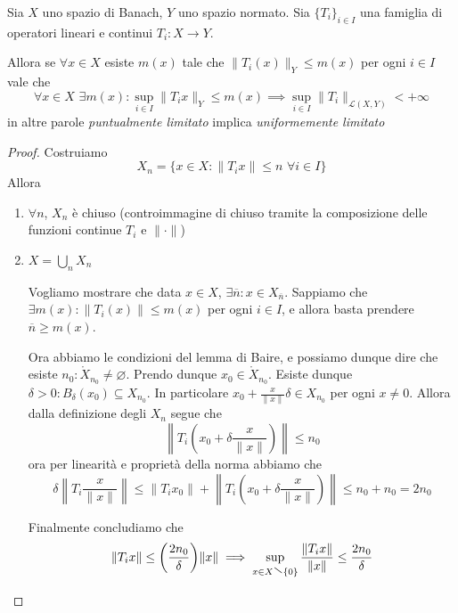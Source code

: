 \begin{theorem}\label{thm:banach-steinhaus}
    Sia \(X\) uno spazio di Banach, \( Y\) uno spazio normato. Sia \(\{T_{i}\}_{i \in I} \) 
    una famiglia di operatori lineari e continui \(T_{i} : X \to Y\).

    Allora se \(\forall x \in X\) esiste \(m {(x)}\) tale che \(\|T_{i}{(x)}\|_Y \le m {(x)}\) per ogni \(i \in I\) vale che 
    \[
      \forall x \in X \,\, \exists m {(x)} : \sup_{i \in I}\|T_{i} x \|_Y \le  m {(x)} \implies \sup_{i \in I} \|T_{i}\|_{\mathcal{L}{(X, Y)}} < +\infty
    \]
    in altre parole \emph{puntualmente limitato} implica \emph{uniformemente
    limitato}
\end{theorem}
\begin{proof}
    Costruiamo 
    \[
      X_{n} = \{x \in X : \|T_{i}x\| \le n \,\, \forall i \in I\}
    \]
    Allora
\begin{enumerate}[label = \arabic*.]
    \item \(\forall n\), \(X_{n}\) è chiuso (controimmagine di chiuso tramite la
        composizione delle funzioni continue \(T_{i}\) e \(\|\cdot \|\))
    \item \(X = \bigcup_{n} X_{n}\)

        Vogliamo mostrare che data \(x \in X\), \(\exists \overline{n} : x \in X_{\overline{n}}\). Sappiamo che \(\exists m {(x)} : \|T_{i}{(x)}\| \le m {(x)}\) per ogni \(i \in I\), e allora basta prendere \(\overline{n} \ge m {(x)}\).

    Ora abbiamo le condizioni del lemma di Baire, e possiamo dunque dire che
    esiste \(n_{0} : \mathring{X}_{n_{0}} \neq \varnothing\). Prendo dunque \(x_{0} \in \mathring{X}_{n_0}\).
    Esiste dunque \(\delta > 0 : B_{\delta} {(x_{0})} \subseteq X_{n_0}\). In
    particolare \(x_{0} + \frac{x}{\|x\|}\delta \in X_{n_{0}} \) per ogni \(x \neq 0\). Allora dalla definizione degli \(X_{n}\) segue che
    \[
      \left\|T_{i} {\left(x_{0} + \delta \frac{x}{\|x\|}\right)}\right\| \le n_{0}
    \]
    ora per linearità e proprietà della norma abbiamo che
    \[
      \delta \left\| T_{i} \frac{x}{\|x\|}\right\| \le \|T_{i} x_{0}\| + \left\|T_i {\left( x_{0} + \delta \frac{x}{\|x\|} \right)} \right\| \le n_{0} + n_{0} = 2n_{0}
    \]

    Finalmente concludiamo che
    \[
        \|T_{i}x\|\le {\left( \frac{2n_{0}}{\delta} \right)} \|x\| \implies \sup_{x \in X \sminus \{0\} } \frac{\|T_{i}x\|}{\|x\|} \le \frac{2n_{0}}{\delta}
    \]
\end{enumerate}

\end{proof}

